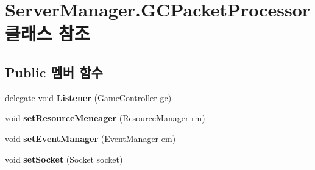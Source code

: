 \hypertarget{class_server_manager_1_1_g_c_packet_processor}{}\section{Server\+Manager.\+G\+C\+Packet\+Processor 클래스 참조}
\label{class_server_manager_1_1_g_c_packet_processor}
\subsection*{Public 멤버 함수}
\begin{DoxyCompactItemize}
\item 
\hypertarget{class_server_manager_1_1_g_c_packet_processor_a0d33dc9f19b414e680949bee2d3a9be7}{}delegate void {\bfseries Listener} (\hyperlink{class_game_controller}{Game\+Controller} gc)\label{class_server_manager_1_1_g_c_packet_processor_a0d33dc9f19b414e680949bee2d3a9be7}

\item 
\hypertarget{class_server_manager_1_1_g_c_packet_processor_aedd912743acb53633850b93b35ab0997}{}void {\bfseries set\+Resource\+Meneager} (\hyperlink{class_resource_manager}{Resource\+Manager} rm)\label{class_server_manager_1_1_g_c_packet_processor_aedd912743acb53633850b93b35ab0997}

\item 
\hypertarget{class_server_manager_1_1_g_c_packet_processor_aedd3fe62e1304e06e85c2a66efa31c11}{}void {\bfseries set\+Event\+Manager} (\hyperlink{class_event_manager}{Event\+Manager} em)\label{class_server_manager_1_1_g_c_packet_processor_aedd3fe62e1304e06e85c2a66efa31c11}

\item 
\hypertarget{class_server_manager_1_1_g_c_packet_processor_ab5beaf78f6e0893059880be46a58ebc2}{}void {\bfseries set\+Socket} (Socket socket)\label{class_server_manager_1_1_g_c_packet_processor_ab5beaf78f6e0893059880be46a58ebc2}


\end{DoxyCompactItemize}
